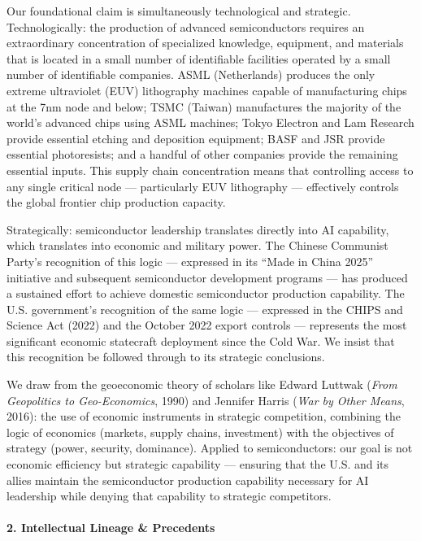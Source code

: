 Our foundational claim is simultaneously technological and strategic.
Technologically: the production of advanced semiconductors requires an
extraordinary concentration of specialized knowledge, equipment, and
materials that is located in a small number of identifiable facilities
operated by a small number of identifiable companies. ASML (Netherlands)
produces the only extreme ultraviolet (EUV) lithography machines capable
of manufacturing chips at the 7nm node and below; TSMC (Taiwan)
manufactures the majority of the world's advanced chips using ASML
machines; Tokyo Electron and Lam Research provide essential etching and
deposition equipment; BASF and JSR provide essential photoresists; and a
handful of other companies provide the remaining essential inputs. This
supply chain concentration means that controlling access to any single
critical node --- particularly EUV lithography --- effectively controls
the global frontier chip production capacity.

Strategically: semiconductor leadership translates directly into AI
capability, which translates into economic and military power. The
Chinese Communist Party's recognition of this logic --- expressed in its
``Made in China 2025'' initiative and subsequent semiconductor
development programs --- has produced a sustained effort to achieve
domestic semiconductor production capability. The U.S. government's
recognition of the same logic --- expressed in the CHIPS and Science Act
(2022) and the October 2022 export controls --- represents the most
significant economic statecraft deployment since the Cold War. We insist
that this recognition be followed through to its strategic conclusions.

We draw from the geoeconomic theory of scholars like Edward Luttwak
(\emph{From Geopolitics to Geo-Economics}, 1990) and Jennifer Harris
(\emph{War by Other Means}, 2016): the use of economic instruments in
strategic competition, combining the logic of economics (markets, supply
chains, investment) with the objectives of strategy (power, security,
dominance). Applied to semiconductors: our goal is not economic
efficiency but strategic capability --- ensuring that the U.S. and its
allies maintain the semiconductor production capability necessary for AI
leadership while denying that capability to strategic competitors.

\paragraph{2. Intellectual Lineage \&
Precedents}\label{intellectual-lineage-precedents-24}

